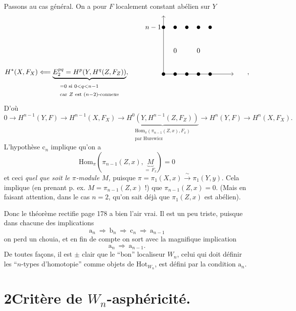 \documentclass[11pt]{article}
\newcommand{\printedpage}[1]{{\reversemarginpar\marginnote{\raggedleft\scriptsize ed.~#1}}}
\newcommand{\msp}[1]{\marginpar{\raggedright\scriptsize ms.~#1}}
\begin{document}
\printedpage{124}

Passons au cas général. On a pour $F$ localement constant abélien sur $Y$
\[
H^*(X,F_X) \Longleftarrow \underbrace{E_2^{pq} = H^p(Y,H^q(Z,F_Z))}_{\begin{array}{l}\scriptstyle = 0 \text{ si } 0<q<n-1\\ \scriptstyle \text{car } Z \text{ est } (n-2)\text{-connexe}\end{array}}, \qquad
\begin{tikzpicture}[baseline=0pt, x=0.6cm, y=0.6cm]
\draw[->] (0,0) -- (0,5);
\draw[->] (0,0) -- (6,0);
\node[left] at (0,4) {$n-1$};
\foreach \i in {0,...,4} { \fill (\i,4) circle (2.5pt); \fill (\i,0) circle (2.5pt); }
\node at (1,2) {$0$};
\node at (3,2) {$0$};
\end{tikzpicture}
\qquad ,
\]
D’où
\[
0 \longrightarrow H^{n-1}(Y,F) \longrightarrow H^{n-1}(X,F_X) \longrightarrow \underbrace{H^0(Y,H^{n-1}(Z,F_Z))}_{\begin{array}{l}\scriptstyle \mathrm{Hom}_\pi(\pi_{n-1}(Z,x),F_x)\\ \scriptstyle \text{par Hurewicz}\end{array}} \longrightarrow H^n(Y,F) \longrightarrow H^n(X,F_X).
\]
L’hypothèse $\mathrm{c}_n$ implique qu’on a
\msp{page 187}
\[
\mathrm{Hom}_\pi(\pi_{n-1}(Z,x),\underbrace{M}_{=\,F_x}) = 0
\]
et ceci \textit{quel que soit le $\pi$-module $M$,} puisque $\pi = \pi_1(X,x) \xrightarrow{\ \sim\ } \pi_1(Y,y)$. Cela implique (en prenant p. ex. $M = \pi_{n-1}(Z,x)$ !) que $\pi_{n-1}(Z,x)=0$. (Mais en faisant attention, dans le cas $n=2$, qu’on sait déjà que $\pi_1(Z,x)$ est abélien).

Donc le théorème rectifie page 178 a bien l’air vrai. Il est un peu triste, puisque dans chacune des implications %
\[
\mathrm{a}_n \ \Longrightarrow\ \mathrm{b}_n \ \Longrightarrow\ \mathrm{c}_n \ \Longrightarrow\ \mathrm{a}_{n-1}
\]
on perd un chouia, et en fin de compte on sort avec la magnifique implication
\[
\mathrm{a}_n \ \Longrightarrow\ \mathrm{a}_{n-1}.
\]
De toutes façons, il est $\pm$ clair que le “bon” localiseur $W_n$, celui qui doit définir les “$n$-types d’homotopie” comme objets de $\mathrm{Hot}_{W_n}$, est défini par la condition $\mathrm{a}_n$.

\section*{2\quad Critère de $W_n$-asphéricité.}
\end{document}
